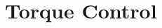 \section{Torque Control}
%
\begin{figure}[ht!]
    \centering
    \caption{}
    \label{fig:TorqueControl}
\end{figure}
%